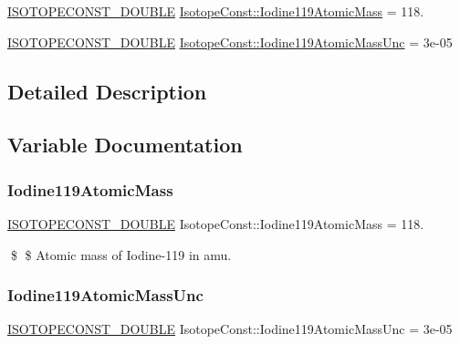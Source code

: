 \begin{DoxyCompactItemize}
\item 
\mbox{\hyperlink{group___isotope_const-_macros_ga8f45a7272ce02c0b4c65c44636ed719a}{I\+S\+O\+T\+O\+P\+E\+C\+O\+N\+S\+T\+\_\+\+D\+O\+U\+B\+LE}} \mbox{\hyperlink{group___isotope_const-_iodine-_i119_ga6d18ac44483b696c316cfc83016a7035}{Isotope\+Const\+::\+Iodine119\+Atomic\+Mass}} = 118.
\item 
\mbox{\hyperlink{group___isotope_const-_macros_ga8f45a7272ce02c0b4c65c44636ed719a}{I\+S\+O\+T\+O\+P\+E\+C\+O\+N\+S\+T\+\_\+\+D\+O\+U\+B\+LE}} \mbox{\hyperlink{group___isotope_const-_iodine-_i119_ga550dcfe3c86b9f46013f4ab9e49296cc}{Isotope\+Const\+::\+Iodine119\+Atomic\+Mass\+Unc}} = 3e-\/05
\end{DoxyCompactItemize}


\subsection{Detailed Description}


\subsection{Variable Documentation}
\mbox{\label{group___isotope_const-_iodine-_i119_ga6d18ac44483b696c316cfc83016a7035}} 
\subsubsection{\texorpdfstring{Iodine119\+Atomic\+Mass}{Iodine119AtomicMass}}
{\footnotesize\ttfamily \mbox{\hyperlink{group___isotope_const-_macros_ga8f45a7272ce02c0b4c65c44636ed719a}{I\+S\+O\+T\+O\+P\+E\+C\+O\+N\+S\+T\+\_\+\+D\+O\+U\+B\+LE}} Isotope\+Const\+::\+Iodine119\+Atomic\+Mass = 118.}

\$ \$ Atomic mass of Iodine-\/119 in amu. \mbox{\label{group___isotope_const-_iodine-_i119_ga550dcfe3c86b9f46013f4ab9e49296cc}} 
\subsubsection{\texorpdfstring{Iodine119\+Atomic\+Mass\+Unc}{Iodine119AtomicMassUnc}}
{\footnotesize\ttfamily \mbox{\hyperlink{group___isotope_const-_macros_ga8f45a7272ce02c0b4c65c44636ed719a}{I\+S\+O\+T\+O\+P\+E\+C\+O\+N\+S\+T\+\_\+\+D\+O\+U\+B\+LE}} Isotope\+Const\+::\+Iodine119\+Atomic\+Mass\+Unc = 3e-\/05}


